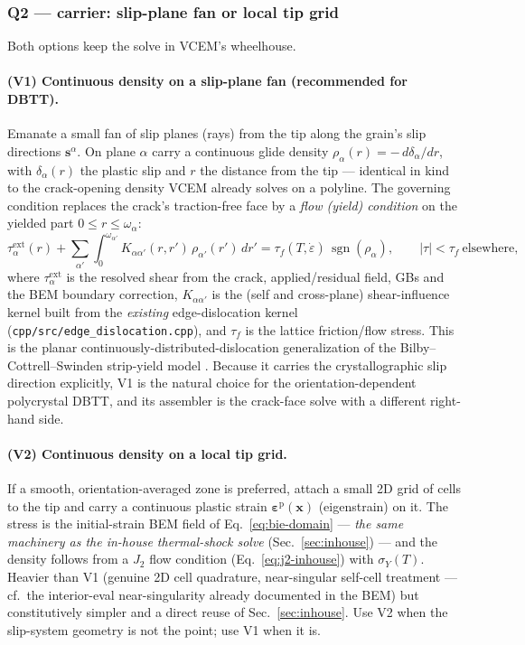 \documentclass[11pt]{article}
\newcommand{\xvec}{\mathbf{x}}
\newcommand{\epspl}{\bm{\varepsilon}^{\mathrm{p}}}
\begin{document}
\subsubsection{Q2 --- carrier: slip-plane fan or local tip grid}
Both options keep the solve in VCEM's wheelhouse.

\paragraph{(V1) Continuous density on a slip-plane fan (recommended for DBTT).}
Emanate a small fan of slip planes (rays) from the tip along the grain's slip
directions $\mathbf s^{\alpha}$. On plane $\alpha$ carry a continuous glide
density $\rho_{\alpha}(r)=-\,d\delta_{\alpha}/dr$, with $\delta_{\alpha}(r)$ the
plastic slip and $r$ the distance from the tip --- identical in kind to the
crack-opening density VCEM already solves on a polyline. The governing condition
replaces the crack's traction-free face by a \emph{flow (yield) condition} on the
yielded part $0\le r\le\omega_{\alpha}$:
\begin{equation}
\tau^{\mathrm{ext}}_{\alpha}(r)
+\sum_{\alpha'}\int_{0}^{\omega_{\alpha'}}\!\!
K_{\alpha\alpha'}(r,r')\,\rho_{\alpha'}(r')\,dr'
=\tau_f(T,\dot\varepsilon)\,\operatorname{sgn}(\rho_\alpha),
\qquad |\tau|<\tau_f \ \text{elsewhere},
\label{eq:cdd}
\end{equation}
where $\tau^{\mathrm{ext}}_{\alpha}$ is the resolved shear from the crack,
applied/residual field, GBs and the BEM boundary correction, $K_{\alpha\alpha'}$
is the (self and cross-plane) shear-influence kernel built from the
\emph{existing} edge-dislocation kernel (\texttt{cpp/src/edge\_dislocation.cpp}),
and $\tau_f$ is the lattice friction/flow stress. This is the planar
continuously-distributed-dislocation generalization of the
Bilby--Cottrell--Swinden strip-yield model \citep{bcs1963,chang_ohr1981}. Because
it carries the crystallographic slip direction explicitly, V1 is the natural
choice for the orientation-dependent polycrystal DBTT, and its assembler is the
crack-face solve with a different right-hand side.

\paragraph{(V2) Continuous density on a local tip grid.} If a smooth,
orientation-averaged zone is preferred, attach a small 2D grid of cells to the
tip and carry a continuous plastic strain $\epspl(\xvec)$ (eigenstrain) on it.
The stress is the initial-strain BEM field of Eq.~\eqref{eq:bie-domain} ---
\emph{the same machinery as the in-house thermal-shock solve}
(Sec.~\ref{sec:inhouse}) --- and the density follows from a $J_2$ flow condition
(Eq.~\eqref{eq:j2-inhouse}) with $\sigma_Y(T)$. Heavier than V1 (genuine 2D cell
quadrature, near-singular self-cell treatment --- cf.\ the interior-eval
near-singularity already documented in the BEM) but constitutively simpler and a
direct reuse of Sec.~\ref{sec:inhouse}. Use V2 when the slip-system geometry is
not the point; use V1 when it is.
\end{document}
